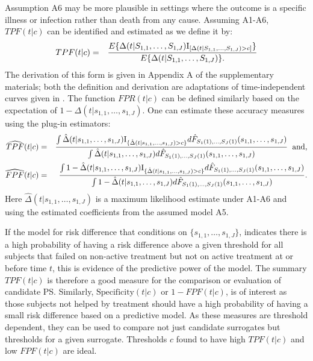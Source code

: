 \documentclass[times, doublespace]{simauth}
\begin{document}
Assumption A6 may be more plausible in settings where the outcome is a specific illness or infection rather than death from any cause. Assuming A1-A6, $TPF(t|c)$ can be identified and estimated as we define it by:
\begin{eqnarray*}
TPF(t|c)&=& E\{\Delta(t|S_{1,1}, \dots, S_{1,J})\mathrm{I}_{[\Delta(t|S_{1,1}, \dots, S_{1,J})>c]}\} \over E\{\Delta(t|S_{1,1}, \dots, S_{1,J})\}.
\end{eqnarray*}
The derivation of this form is given in Appendix A of the supplementary materials; both the definition and derivation are adaptations of time-independent curves given in \citet{Huang12b}. The function $FPR(t|c)$ can be defined similarly based on the expectation of $1-\Delta(t|s_{1,1}, \dots, s_{1,J})$. One can estimate these accuracy measures using the plug-in estimators:
\begin{eqnarray*}
\widehat{TPF}(t|c)&=& {\int \hat{\Delta}(t|s_{1,1}, \dots, s_{1,J})\mathrm{I}_{\{\hat{\Delta}(t|s_{1,1}, \dots, s_{1,J})>c\}}d\hat{F}_{S_1(1), \ldots, S_J(1)}(s_{1,1}, \dots, s_{1,J}) \over \int \hat{\Delta}(t|s_{1,1}, \dots, s_{1,J})d\hat{F}_{S_1(1), \ldots, S_J(1)}(s_{1,1}, \dots, s_{1,J})} \hspace{2mm}\mbox{and},\\
\widehat{FPF}(t|c)&=& {\int 1-\hat{\Delta}(t|s_{1,1}, \dots, s_{1,J})\mathrm{I}_{\{\hat{\Delta}(t|s_{1,1}, \dots, s_{1,J})>c\}}d\hat{F}_{S_1(1), \ldots, S_J(1)}(s_{1,1}, \dots, s_{1,J}) \over \int 1-\hat{\Delta}(t|s_{1,1}, \dots, s_{1,J})d\hat{F}_{S_1(1), \ldots, S_J(1)}(s_{1,1}, \dots, s_{1,J})}.\\
\end{eqnarray*}
Here $\hat{\Delta}(t|s_{1,1}, \dots, s_{1,J})$ is a maximum likelihood estimate under A1-A6 and using the estimated coefficients from the assumed model A5. 

If the model for risk difference that conditions on $\{s_{1,1}, \ldots, s_{1,J}\}$, indicates there is a high probability of having a risk difference above a given threshold for all subjects that failed on non-active treatment but not on active treatment at or before time $t$, this is evidence of the predictive power of the model. The summary $TPF(t|c)$ is therefore a good measure for the comparison or evaluation of candidate PS. Similarly, $\mbox{Specificity}(t|c)$ or $1-FPF(t|c)$, is of interest as those subjects not helped by treatment should have a high probability of having a small risk difference based on a predictive model. As these measures are threshold dependent, they can be used to compare not just candidate surrogates but thresholds for a given surrogate. Thresholds $c$ found to have high $TPF(t|c)$ and low $FPF(t|c)$ are ideal. 
\end{document}
